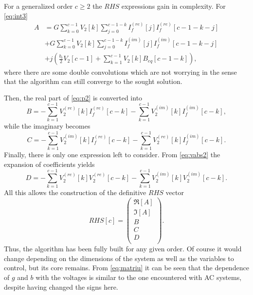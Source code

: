 \documentclass[conference]{IEEEtran}
\begin{document}
For a generalized order $c\geq 2$ the $RHS$ expressions gain in complexity. For \eqref{eq:int3}
\begin{equation}
  \begin{split}
  A &= G\sum_{k=0}^{c-1}V_2[k]\sum_{j=0}^{c-1-k}I^{(re)}_f[j]I^{(re)}_f[c-1-k-j]\\
  & +G\sum_{k=0}^{c-1}V_2[k]\sum_{j=0}^{c-1-k}I^{(im)}_f[j]I^{(im)}_f[c-1-k-j]\\
  &+j(\frac{b_c}{2}V_2[c-1] + \sum_{k=1}^{c-1}V_2[k]B_{eq}[c-1-k]),
  \end{split}
  \label{eq:A2}
\end{equation}
where there are some double convolutions which are not worrying in the sense that the algorithm can still converge to the sought solution.

Then, the real part of \eqref{eq:p2} is converted into
\begin{equation}
    B=-\sum_{k=1}^{c-1}V^{(re)}_2[k]I^{(re)}_f[c-k]-\sum_{k=1}^{c-1}V^{(im)}_2[k]I^{(im)}_f[c-k],
  \label{eq:B}
\end{equation}
while the imaginary becomes
\begin{equation}
  C=-\sum_{k=1}^{c-1}V^{(im)}_2[k]I^{(re)}_f[c-k]-\sum_{k=1}^{c-1}V^{(re)}_2[k]I^{(im)}_f[c-k].
\label{eq:C}
\end{equation}
Finally, there is only one expression left to consider. From \eqref{eq:vabs2} the expansion of coefficients yields
\begin{equation}
  D = -\sum_{k=1}^{c-1}V^{(re)}_2[k]V^{(re)}_2[c-k]-\sum_{k=1}^{c-1}V^{(im)}_2[k]V^{(im)}_2[c-k].
  \label{eq:D}
\end{equation}
All this allows the construction of the definitive $RHS$ vector
\begin{equation}
  RHS[c]=\begin{pmatrix}
    \Re[A]\\
    \Im[A]\\
    B\\
    C\\
    D\\
  \end{pmatrix}.
  \label{eq:rhsc}
\end{equation}
Thus, the algorithm has been fully built for any given order. Of course it would change depending on the dimensions of the system as well as the variables to control, but its core remains. From \eqref{eq:matriu} it can be seen that the dependence of $g$ and $b$ with the voltages is similar to the one encountered with AC systems, despite having changed the signs here.
\end{document}
